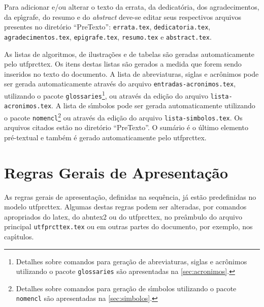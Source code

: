 Para adicionar e/ou alterar o texto da errata, da dedicat\'oria, dos agradecimentos, da ep\'{\i}grafe, do resumo e do \textit{abstract} deve-se editar seus respectivos arquivos presentes no diret\'orio ``PreTexto'': \texttt{errata.tex}, \texttt{dedicatoria.tex}, \texttt{agradecimentos.tex}, \texttt{epigrafe.tex}, \texttt{resumo.tex} e \texttt{abstract.tex}.

As listas de algoritmos, de ilustra\c{c}\~oes e de tabelas s\~ao geradas automaticamente pelo \gls{utfprcttex}. Os itens destas listas s\~ao gerados a medida que forem sendo inseridos no texto do documento. A lista de abreviaturas, siglas e acr\^onimos pode ser gerada automaticamente atrav\'es do arquivo \texttt{entradas-acronimos.tex}, utilizando o pacote \texttt{glossaries}\footnote{Detalhes sobre comandos para gera\c{c}\~ao de abreviaturas, siglas e acr\^onimos utilizando o pacote \texttt{glossaries} s\~ao apresentadas na \autoref{sec:acronimos}.}, ou atrav\'es da edi\c{c}\~ao do arquivo \texttt{lista-acronimos.tex}. A lista de s\'{\i}mbolos pode ser gerada automaticamente utilizando o pacote \texttt{nomencl}\footnote{Detalhes sobre comandos para gera\c{c}\~ao de s\'{\i}mbolos utilizando o pacote \texttt{nomencl} s\~ao apresentadas na \autoref{sec:simbolos}.} ou atrav\'es da edi\c{c}\~ao do arquivo \texttt{lista-simbolos.tex}. Os arquivos citados est\~ao no diret\'orio ``PreTexto''. O sum\'ario \'e o \'ultimo elemento pr\'e-textual e tamb\'em \'e gerado automaticamente pelo \gls{utfprcttex}.

\section{Regras Gerais de Apresenta\c{c}\~ao}\label{sec:regrasgerais}

As regras gerais de apresenta\c{c}\~ao, definidas na sequ\^encia, j\'a est\~ao predefinidas no modelo \gls{utfprcttex}. Algumas destas regras podem ser alteradas, por comandos apropriados do \gls{latex}, do \gls{abntex2} ou do \gls{utfprcttex}, no pre\^ambulo do arquivo principal \texttt{utfprcttex.tex} ou em outras partes do documento, por exemplo, nos cap\'{\i}tulos.


